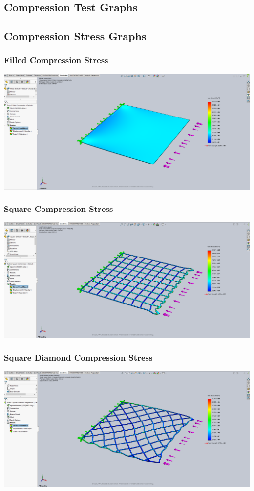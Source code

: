 \documentclass[12pt, letterpaper]{article}
\begin{document}
\begin{singlespace}
\section{Compression Test Graphs}
\label{ap:c}



\subsection{Compression Stress Graphs}
\label{ap:c-vm}


\subsubsection{Filled Compression Stress}
\label{ap:f-c-vm}
\includegraphics[width=0.8\linewidth]{./graphs/compression/filled-compression-stress}

\subsubsection{Square Compression Stress}
\label{ap:s-c-vm}
\includegraphics[width=0.8\linewidth]{./graphs/compression/square-compression-stress}

\subsubsection{Square Diamond Compression Stress}
\label{ap:sd-c-vm}
\includegraphics[width=0.8\linewidth]{./graphs/compression/square-diamond-compression-stress}


\end{singlespace}
\end{document}
